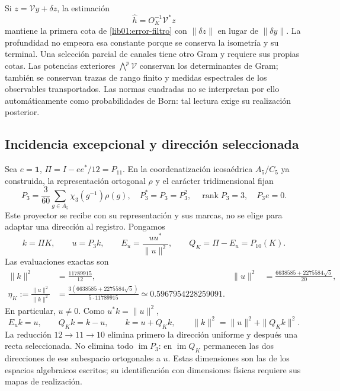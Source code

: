 Si \(z=\mathcal Vy+\delta z\), la estimación
\[
 \widehat h=O_K^{-1}\mathcal V^*z
\]
mantiene la primera cota de \eqref{lib01:error-filtro} con
\(\|\delta z\|\) en lugar de \(\|\delta y\|\). La profundidad
no empeora esa constante porque se conserva la isometría y su terminal.
Una selección parcial de canales tiene otro Gram y requiere sus propias
cotas. Las potencias exteriores \(\bigwedge^p\mathcal V\) conservan
los determinantes de Gram; también se conservan trazas de rango finito y
medidas espectrales de los observables transportados. Las normas
cuadradas no se interpretan por ello automáticamente como probabilidades
de Born: tal lectura exige su realización posterior.

\subsection{Incidencia excepcional y dirección seleccionada}
\label{lib01:direccion}

Sea \(e=\mathbf1\), \(\Pi=I-ee^*/12=P_{11}\). En la coordenatización
icosaédrica \(A_5/C_5\) ya construida, la representación ortogonal
\(\rho\) y el carácter tridimensional fijan
\begin{equation}
 P_3=\frac3{60}\sum_{g\in A_5}\chi_3(g^{-1})\rho(g),
 \quad P_3^*=P_3=P_3^2,\quad
 \operatorname{rank}P_3=3,\quad P_3e=0.
 \label{lib01:P3}
\end{equation}
Este proyector se recibe con su representación y sus marcas, no se elige
para adaptar una dirección al registro. Pongamos
\[
 k=\Pi K,\qquad u=P_3k,\qquad
 E_u=\frac{uu^*}{\|u\|^2},\qquad Q_K=\Pi-E_u=P_{10}(K).
\]
Las evaluaciones exactas son
\begin{align}
 \|k\|^2&=\frac{11789915}{12},&
 \|u\|^2&=\frac{6638585+2275584\sqrt5}{20},
 \label{lib01:normas-direccion}\\
 \eta_K:=\frac{\|u\|^2}{\|k\|^2}
 &=\frac{3(6638585+2275584\sqrt5)}{5\cdot11789915}
 \simeq0.5967954228259091.
 \label{lib01:eta}
\end{align}
En particular, \(u\ne0\). Como \(u^*k=\|u\|^2\),
\begin{equation}
 E_uk=u,\qquad Q_Kk=k-u,\qquad
 k=u+Q_Kk,\qquad \|k\|^2=\|u\|^2+\|Q_Kk\|^2.
 \label{lib01:particion-direccion}
\end{equation}
La reducción \(12\to11\to10\) elimina primero la dirección uniforme
y después una recta seleccionada. No elimina todo \(\operatorname{im}P_3\):
en \(\operatorname{im}Q_K\) permanecen las dos direcciones de ese
subespacio ortogonales a \(u\). Estas dimensiones son las de los
espacios algebraicos escritos; su identificación con dimensiones físicas
requiere sus mapas de realización.

